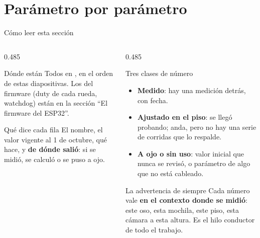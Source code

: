 \section{Parámetro por parámetro}
\newcommand{\tablaparam}[1]{%
  \begin{tabular}{L{3.1cm}L{1.25cm}L{4.85cm}L{4.3cm}}
    \toprule
    \textbf{Parámetro} & \textbf{Valor} & \textbf{Qué hace} & \textbf{De dónde sale} \\
    \midrule
    #1
    \bottomrule
  \end{tabular}}

\begin{frame}{Cómo leer esta sección}
  \begin{columns}[T,onlytextwidth]
    \begin{column}{0.485\textwidth}
      \begin{block}{Dónde están}
        {\small Todos en , en el orden de estas diapositivas. Los
        del firmware (duty de cada rueda, watchdog) están en la sección ``El
        firmware del ESP32''.}
      \end{block}
      \begin{block}{Qué dice cada fila}
        {\small El nombre, el valor vigente al 1 de octubre, qué hace, y \textbf{de
        dónde salió}: si se midió, se calculó o se puso a ojo.}
      \end{block}
    \end{column}
    \begin{column}{0.485\textwidth}
      \begin{block}{Tres clases de número}
        {\small
        \begin{itemize}
          \item \listo{} \textbf{Medido}: hay una medición detrás, con fecha.
          \item \curso{} \textbf{Ajustado en el piso}: se llegó probando; anda,
                pero no hay una serie de corridas que lo respalde.
          \item \pend{} \textbf{A ojo o sin uso}: valor inicial que nunca se
                revisó, o parámetro de algo que no está cableado.
        \end{itemize}}
      \end{block}
      \begin{alertblock}{La advertencia de siempre}
        {\small Cada número vale \textbf{en el contexto donde se midió}: este
        oso, esta mochila, este piso, esta cámara a esta altura. Es el hilo
        conductor de todo el trabajo.}
      \end{alertblock}
    \end{column}
  \end{columns}
\end{frame}

